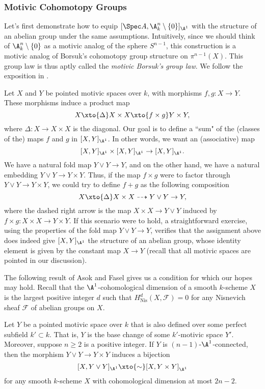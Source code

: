 \subsubsection{Motivic Cohomotopy Groups}

Let's first demonstrate how to equip $[\Spec A, \A^n_k\setminus\{0\}]_{\A^1}$ with the structure of an abelian group under the same assumptions. Intuitively, since we should think of $\A^n_k\setminus\{0\}$ as a motivic analog of the sphere $S^{n-1}$, this construction is a motivic analog of Borsuk's cohomotopy group structure on $\pi^{n-1}(X)$. This group law is thus aptly called the \textit{motivic Borsuk's group law}. We follow the exposition in \cite[Section 4]{LERBET2024109415}. 

Let $X$ and $Y$ be pointed motivic spaces over $k$, with morphisms $f,g: X \to Y$. These morphisms induce a product map
\[
X \xto{\Delta} X \times X \xto{f \times g} Y \times Y,
\]
where $\Delta: X \to X \times X$ is the diagonal. Our goal is to define a ``sum" of the (classes of the) maps $f$ and $g$ in $[X, Y]_{\A^1}$. In other words, we want an (associative) map 
\[
[X, Y]_{\A^1} \times [X, Y]_{\A^1} \to [X,Y]_{\A^1}. 
\]
We have a natural fold map $Y \vee Y \to Y$, and on the other hand, we have a natural embedding $Y \vee Y \to Y \times Y$. Thus, if the map $f \times g$ were to factor through $Y \vee Y \to Y \times Y$, we could try to define $f + g$ as the following composition
\[
X \xto{\Delta} X \times X \dashrightarrow Y \vee Y \to Y, 
\]
where the dashed right arrow is the map $X \times X \to Y \vee Y$ induced by $f \times g: X \times X \to Y \times Y$. If this scenario were to hold, a straightforward exercise, using the properties of the fold map $Y \vee Y \to Y$, verifies that the assignment above does indeed give $[X,Y]_{\A^1}$ the structure of an abelian group, whose identity element is given by the constant map $X \to Y$ (recall that all motivic spaces are pointed in our discussion). 

The following result of Asok and Fasel \cite[Proposition 1.2.3]{AF22} gives us a condition for which our hopes may hold. Recall that the $\A^1$-cohomological dimension of a smooth $k$-scheme $X$ is the largest positive integer $d$ such that $H^d_{\operatorname{Nis}}(X,\mathcal{F}) = 0$ for any Nisnevich sheaf $\mathcal{F}$ of abelian groups on $X$. 

\begin{theorem}\label{thm:af_group}
    Let $Y$ be a pointed motivic space over $k$ that is also defined over some perfect subfield $k' \subset k$. That is, $Y$ is the base change of some $k'$-motivic space $Y'$. Moreover, suppose $n \geq 2$ is a positive integer. If $Y$ is $(n-1)$-$\A^1$-connected, then the morphism $Y \vee Y \to Y \times Y$ induces a bijection
    \[
    [X, Y \vee Y]_{\A^1} \xto{\sim} [X, Y \times Y]_{\A^1}
    \]
    for any smooth $k$-scheme $X$ with cohomological dimension at most $2n-2$. 
\end{theorem}

